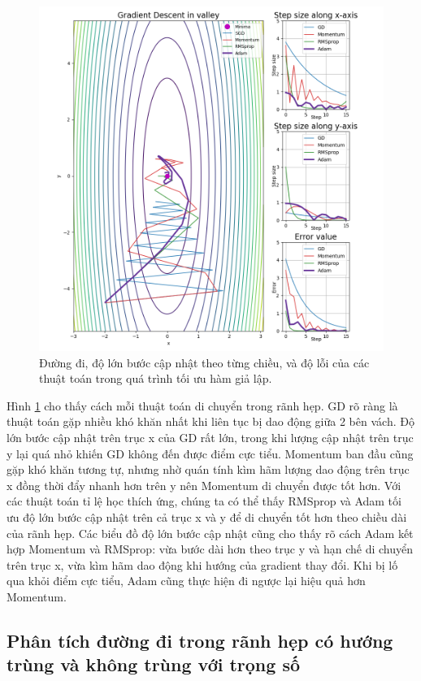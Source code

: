 \begin{figure}[htp]
	\centering
	\includegraphics[width=140 mm]{images/step-size.png}
	\caption{Đường đi, độ lớn bước cập nhật theo từng chiều, và độ lỗi của các thuật toán trong quá trình tối ưu hàm giả lập.}
	\label{fig:aligned-step-size}
\end{figure}

Hình \ref{fig:aligned-step-size} cho thấy cách mỗi thuật toán di chuyển trong rãnh hẹp. GD rõ ràng là thuật toán gặp nhiều khó khăn nhất khi liên tục bị dao động giữa 2 bên vách. Độ lớn bước cập nhật trên trục x của GD rất lớn, trong khi lượng cập nhật trên trục y lại quá nhỏ khiến GD không đến được điểm cực tiểu. Momentum ban đầu cũng gặp khó khăn tương tự, nhưng nhờ quán tính kìm hãm lượng dao động trên trục x đồng thời đẩy nhanh hơn trên y nên Momentum di chuyển được tốt hơn. Với các thuật toán tỉ lệ học thích ứng, chúng ta có thể thấy RMSprop và Adam tối ưu độ lớn bước cập nhật trên cả trục x và y để di chuyển tốt hơn theo chiều dài của rãnh hẹp. Các biểu đồ độ lớn bước cập nhật cũng cho thấy rõ cách Adam kết hợp Momentum và RMSprop: vừa bước dài hơn theo trục y và hạn chế di chuyển trên trục x, vừa kìm hãm dao động khi hướng của gradient thay đổi. Khi bị lố qua khỏi điểm cực tiểu, Adam cũng thực hiện đi ngược lại hiệu quả hơn Momentum.

\subsection{Phân tích đường đi trong rãnh hẹp có hướng trùng và không trùng với trọng số}

